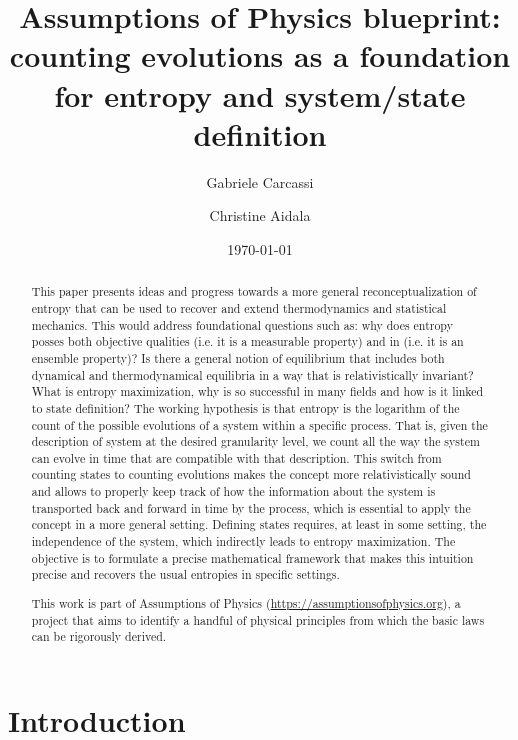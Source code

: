 \documentclass[10pt, onecolumn, longbibliography, nofootinbib]{revtex4-2}
\begin{document}
\title{Assumptions of Physics blueprint: counting evolutions as a foundation for entropy and system/state definition}
\author{Gabriele Carcassi}
\author{Christine Aidala}
\date{\today}

\begin{abstract}
    This paper presents ideas and progress towards a more general reconceptualization of entropy that can be used to recover and extend thermodynamics and statistical mechanics. This would address foundational questions such as: why does entropy posses both objective qualities (i.e. it is a measurable property) and in (i.e. it is an ensemble property)? Is there a general notion of equilibrium that includes both dynamical and thermodynamical equilibria in a way that is relativistically invariant? What is entropy maximization, why is so successful in many fields and how is it linked to state definition? The working hypothesis is that entropy is the logarithm of the count of the possible evolutions of a system within a specific process. That is, given the description of system at the desired granularity level, we count all the way the system can evolve in time that are compatible with that description. This switch from counting states to counting evolutions makes the concept more relativistically sound and allows to properly keep track of how the information about the system is transported back and forward in time by the process, which is essential to apply the concept in a more general setting. Defining states requires, at least in some setting, the independence of the system, which indirectly leads to entropy maximization. The objective is to formulate a precise mathematical framework that makes this intuition precise and recovers the usual entropies in specific settings.
    
	This work is part of Assumptions of Physics (\url{https://assumptionsofphysics.org}), a project that aims to identify a handful of physical principles from which the basic laws can be rigorously derived.
\end{abstract}

\maketitle

\section{Introduction}
\end{document}
